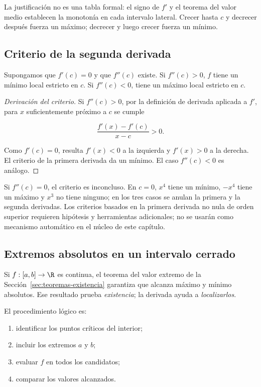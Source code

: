 La justificación no es una tabla formal: el signo de \(f'\) y el teorema del
valor medio establecen la monotonía en cada intervalo lateral. Crecer hasta
\(c\) y decrecer después fuerza un máximo; decrecer y luego crecer fuerza un
mínimo.

\subsection{Criterio de la segunda derivada}

\begin{teorema}
Supongamos que \(f'(c)=0\) y que \(f''(c)\) existe. Si \(f''(c)>0\), \(f\)
tiene un mínimo local estricto en \(c\). Si \(f''(c)<0\), tiene un máximo
local estricto en \(c\).
\end{teorema}

\begin{proof}[Derivación del criterio]
Si \(f''(c)>0\), por la definición de derivada aplicada a \(f'\), para \(x\)
suficientemente próximo a \(c\) se cumple

\[
  \frac{f'(x)-f'(c)}{x-c}>0.
\]

Como \(f'(c)=0\), resulta \(f'(x)<0\) a la izquierda y \(f'(x)>0\) a la
derecha. El criterio de la primera derivada da un mínimo. El caso
\(f''(c)<0\) es análogo.
\end{proof}

Si \(f''(c)=0\), el criterio es inconcluso. En \(c=0\), \(x^4\) tiene un
mínimo, \(-x^4\) tiene un máximo y \(x^3\) no tiene ninguno; en los tres casos
se anulan la primera y la segunda derivadas. Los criterios basados en la
primera derivada no nula de orden superior requieren hipótesis y herramientas
adicionales; no se usarán como mecanismo automático en el núcleo de este
capítulo.

\subsection{Extremos absolutos en un intervalo cerrado}

Si \(f:[a,b]\to\R\) es continua, el teorema del valor extremo de la
Sección~\ref{sec:teoremas-existencia} garantiza que alcanza máximo y mínimo
absolutos. Ese resultado prueba \emph{existencia}; la derivada ayuda a
\emph{localizarlos}.

El procedimiento lógico es:

\begin{enumerate}
  \item identificar los puntos críticos del interior;
  \item incluir los extremos \(a\) y \(b\);
  \item evaluar \(f\) en todos los candidatos;
  \item comparar los valores alcanzados.
\end{enumerate}

